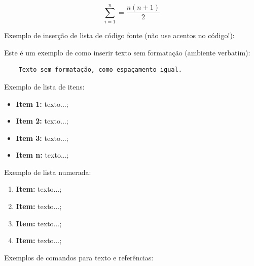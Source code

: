 \begin{equation}
\sum_{i=1}^{n} = \frac{n(n+1)}{2}
\label{eq:exemplo}
\end{equation}


Exemplo de inserção de lista de código fonte (não use acentos no código!):

 



Este é um exemplo de como inserir texto sem formatação (ambiente verbatim):

\begin{verbatim}
	Texto sem formatação, como espaçamento igual.
\end{verbatim}


Exemplo de lista de itens:

\begin{itemize}
	\item \textbf{Item 1:} texto...;
	\item \textbf{Item 2:} texto...;
	\item \textbf{Item 3:} texto...;
	\item \textbf{Item n:} texto...;
\end{itemize}


Exemplo de lista numerada:

\begin{enumerate}
	\item \textbf{Item:} texto...;
	\item \textbf{Item:} texto...;
	\item \textbf{Item:} texto...;
	\item \textbf{Item:} texto...;
\end{enumerate}


Exemplos de comandos para texto e referências:

